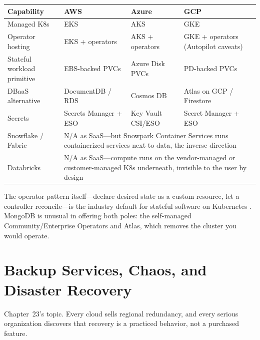 \begin{center}
\footnotesize
\begin{tabular}{@{}p{2.9cm}p{3.0cm}p{3.0cm}p{3.0cm}@{}}
\toprule
\textbf{Capability} & \textbf{AWS} & \textbf{Azure} & \textbf{GCP} \\
\midrule
Managed K8s & EKS & AKS & GKE \\
Operator hosting & EKS + operators & AKS + operators & GKE + operators (Autopilot caveats) \\
Stateful workload primitive & EBS-backed PVCs & Azure Disk PVCs & PD-backed PVCs \\
DBaaS alternative & DocumentDB / RDS & Cosmos DB & Atlas on GCP / Firestore \\
Secrets & Secrets Manager + ESO & Key Vault CSI/ESO & Secret Manager + ESO \\
\addlinespace
Snowflake / Fabric & \multicolumn{3}{l}{N/A as SaaS---but Snowpark Container Services runs containerized services next to data, the inverse direction} \\
Databricks & \multicolumn{3}{l}{N/A as SaaS---compute runs on the vendor-managed or customer-managed K8s underneath, invisible to the user by design} \\
\bottomrule
\end{tabular}
\end{center}

\noindent The operator pattern itself---declare desired state as a custom resource, let a
controller reconcile---is the industry default for stateful software on Kubernetes
\cite{mongodbK8sOperatorDocs,kubernetesDocs}. MongoDB is unusual in offering both poles: the
self-managed Community/Enterprise Operators and Atlas, which removes the cluster you would operate.

\section{Backup Services, Chaos, and Disaster Recovery}
%
Chapter~23's topic. Every cloud sells regional redundancy, and every serious organization
discovers that recovery is a practiced behavior, not a purchased feature.

